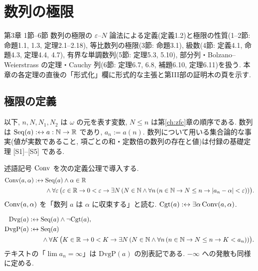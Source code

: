 \chapter{数列の極限}\label{ch:text3}

\begin{textref}{第3章 1節--6節}
  数列の極限の $\varepsilon$--$N$ 論法による定義(定義1.2)と極限の性質(1--2節: 命題1.1, 1.3, 定理2.1--2.18), 等比数列の極限(3節: 命題3.1), 級数(4節: 定義4.1, 命題4.3, 定理4.4, 4.7), 有界な単調数列(5節: 定理5.3, 5.10), 部分列・Bolzano--Weierstrass の定理・Cauchy 列(6節: 定理6.7, 6.8, 補題6.10, 定理6.11)を扱う. 本章の各定理の直後の「形式化」欄に形式的な主張と第III部の証明木の頁を示す.
\end{textref}

\section{極限の定義}

以下, $n, N, N_1, N_2$ は $\omega$ の元を表す変数, $N \leq n$ は第\ref{ch:zfc}章の順序である. 数列は $\mathrm{Seq}(a) :\leftrightarrow a : \mathbb{N} \to \mathbb{R}$ であり, $a_n := a(n)$. 数列について用いる集合論的な事実(値が実数であること, 項ごとの和・定数倍の数列の存在と値)は付録の基礎定理 [S1]--[S5] である.

\begin{dfn}[テキスト定義1.2(1)]\label{dfn:conv}
  述語記号 $\mathrm{Conv}$ を次の定義公理で導入する.
  \begin{align*}
    \mathrm{Conv}(a, \alpha) :\leftrightarrow{}& \mathrm{Seq}(a) \land \alpha \in \mathbb{R} \\
    & \land \forall \varepsilon\,\bigl(\varepsilon \in \mathbb{R} \to 0 < \varepsilon \to \exists N\,(N \in \mathbb{N} \land \forall n\,(n \in \mathbb{N} \to N \leq n \to \lvert a_n - \alpha\rvert < \varepsilon))\bigr).
  \end{align*}
  $\mathrm{Conv}(a, \alpha)$ を「数列 $a$ は $\alpha$ に収束する」と読む. $\mathrm{Cgt}(a) :\leftrightarrow \exists \alpha\,\mathrm{Conv}(a, \alpha)$.
\end{dfn}

\begin{dfn}[テキスト定義1.2(2)]
  \begin{align*}
    \mathrm{Dvg}(a) &:\leftrightarrow \mathrm{Seq}(a) \land \neg\mathrm{Cgt}(a),\\
    \mathrm{DvgP}(a) &:\leftrightarrow \mathrm{Seq}(a) \\
    &\qquad \land \forall K\,\bigl(K \in \mathbb{R} \to 0 < K \to \exists N\,(N \in \mathbb{N} \land \forall n\,(n \in \mathbb{N} \to N \leq n \to K < a_n))\bigr).
  \end{align*}
  テキストの「$\lim a_n = \infty$」は $\mathrm{DvgP}(a)$ の別表記である. $-\infty$ への発散も同様に定める.
\end{dfn}

